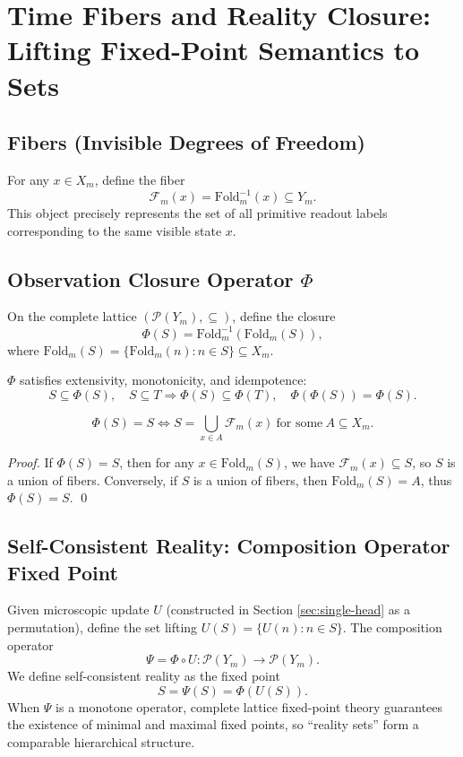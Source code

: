 \section{Time Fibers and Reality Closure: Lifting Fixed-Point Semantics to Sets}

\subsection{Fibers (Invisible Degrees of Freedom)}

For any $x\in X_m$, define the fiber
\[
\mathcal{F}_m(x)=\mathrm{Fold}_m^{-1}(x)\subseteq Y_m.
\]
This object precisely represents the set of all primitive readout labels corresponding to the same visible state $x$.

\subsection{Observation Closure Operator \texorpdfstring{$\Phi$}{Phi}}

On the complete lattice $(\mathcal{P}(Y_m),\subseteq)$, define the closure
\[
\Phi(S)=\mathrm{Fold}_m^{-1}(\mathrm{Fold}_m(S)),
\]
where $\mathrm{Fold}_m(S)=\{\mathrm{Fold}_m(n):n\in S\}\subseteq X_m$.

\begin{lemma}\label{lem:closure-properties}
$\Phi$ satisfies extensivity, monotonicity, and idempotence:
\[
S\subseteq \Phi(S),\quad S\subseteq T\Rightarrow \Phi(S)\subseteq \Phi(T),\quad \Phi(\Phi(S))=\Phi(S).
\]
\end{lemma}

\begin{theorem}\label{thm:closure-fix}
\[
\Phi(S)=S\iff S=\bigcup_{x\in A}\mathcal{F}_m(x)\ \text{for some}\ A\subseteq X_m.
\]
\end{theorem}

\begin{proof}
If $\Phi(S)=S$, then for any $x\in \mathrm{Fold}_m(S)$, we have $\mathcal{F}_m(x)\subseteq S$, so $S$ is a union of fibers. Conversely, if $S$ is a union of fibers, then $\mathrm{Fold}_m(S)=A$, thus $\Phi(S)=S$. \qed
\end{proof}

\subsection{Self-Consistent Reality: Composition Operator Fixed Point}

Given microscopic update $U$ (constructed in Section \ref{sec:single-head} as a permutation), define the set lifting $U(S)=\{U(n):n\in S\}$. The composition operator
\[
\Psi=\Phi\circ U:\mathcal{P}(Y_m)\to\mathcal{P}(Y_m).
\]
We define self-consistent reality as the fixed point
\[
S=\Psi(S)=\Phi(U(S)).
\]
When $\Psi$ is a monotone operator, complete lattice fixed-point theory guarantees the existence of minimal and maximal fixed points, so ``reality sets'' form a comparable hierarchical structure.
